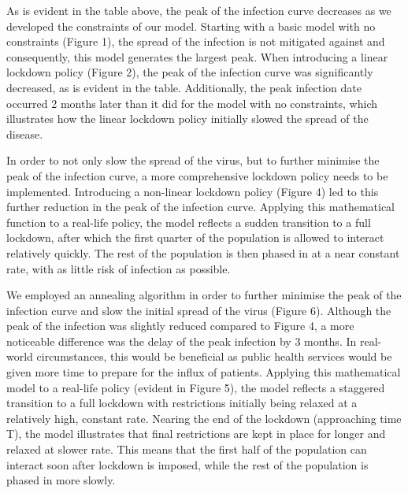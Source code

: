 \documentclass[10pt]{article}
\begin{document}
As is evident in the table above, the peak of the infection curve decreases as we developed the constraints of our model. Starting with a basic model with no constraints (Figure 1), the spread of the infection is not mitigated against and consequently, this model generates the largest peak. When introducing a linear lockdown policy (Figure 2), the peak of the infection curve was significantly decreased, as is evident in the table. Additionally, the peak infection date occurred 2 months later than it did for the model with no constraints, which illustrates how the linear lockdown policy initially slowed the spread of the disease. \newline

In order to not only slow the spread of the virus, but to further minimise the peak of the infection curve, a more comprehensive lockdown policy needs to be implemented. Introducing a non-linear lockdown policy (Figure 4) led to this further reduction in the peak of the infection curve. Applying this mathematical function to a real-life policy, the model reflects a sudden transition to a full lockdown, after which the first quarter of the population is allowed to interact relatively quickly. The rest of the population is then  phased in at a near constant rate, with as little risk of infection as possible. \newline

We employed an annealing algorithm in order to further minimise the peak of the infection curve and slow the initial spread of the virus (Figure 6). Although the peak of the infection was slightly reduced compared to Figure 4, a more noticeable difference was the delay of the peak infection by 3 months. In real-world circumstances, this would be beneficial as public health services would be given more time to prepare for the influx of patients. Applying this mathematical model to a real-life policy (evident in Figure 5), the model reflects a staggered transition to a full lockdown with restrictions  initially being relaxed at a relatively high, constant rate. Nearing the end of the lockdown (approaching time T), the model illustrates that final restrictions are kept in place for longer and relaxed at slower rate. This means that the first half of the population can interact soon after lockdown is imposed, while the rest of the population is phased in more slowly. \newline
\end{document}
